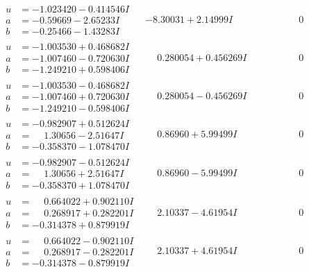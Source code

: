 \documentclass[1p]{elsarticle_modified}
\theoremstyle{definition}
\begin{document}
$$\begin{array}{c|c|c}
\begin{aligned}
u &= -1.023420 - 0.414546 I \\
a &= -0.59669 - 2.65233 I \\
b &= -0.25466 - 1.43283 I\end{aligned}
 & -8.30031 + 2.14999 I & \phantom{-0.000000 } 0 \\ \hline\begin{aligned}
u &= -1.003530 + 0.468682 I \\
a &= -1.007460 - 0.720630 I \\
b &= -1.249210 + 0.598406 I\end{aligned}
 & \phantom{-}0.280054 + 0.456269 I & \phantom{-0.000000 } 0 \\ \hline\begin{aligned}
u &= -1.003530 - 0.468682 I \\
a &= -1.007460 + 0.720630 I \\
b &= -1.249210 - 0.598406 I\end{aligned}
 & \phantom{-}0.280054 - 0.456269 I & \phantom{-0.000000 } 0 \\ \hline\begin{aligned}
u &= -0.982907 + 0.512624 I \\
a &= \phantom{-}1.30656 - 2.51647 I \\
b &= -0.358370 - 1.078470 I\end{aligned}
 & \phantom{-}0.86960 + 5.99499 I & \phantom{-0.000000 } 0 \\ \hline\begin{aligned}
u &= -0.982907 - 0.512624 I \\
a &= \phantom{-}1.30656 + 2.51647 I \\
b &= -0.358370 + 1.078470 I\end{aligned}
 & \phantom{-}0.86960 - 5.99499 I & \phantom{-0.000000 } 0 \\ \hline\begin{aligned}
u &= \phantom{-}0.664022 + 0.902110 I \\
a &= \phantom{-}0.268917 + 0.282201 I \\
b &= -0.314378 + 0.879919 I\end{aligned}
 & \phantom{-}2.10337 - 4.61954 I & \phantom{-0.000000 } 0 \\ \hline\begin{aligned}
u &= \phantom{-}0.664022 - 0.902110 I \\
a &= \phantom{-}0.268917 - 0.282201 I \\
b &= -0.314378 - 0.879919 I\end{aligned}
 & \phantom{-}2.10337 + 4.61954 I & \phantom{-0.000000 } 0 \\ \hline\begin{aligned}

\end{aligned}
\end{array}$$
\end{document}
